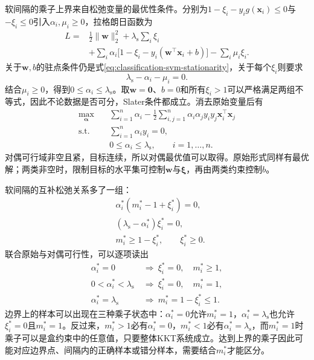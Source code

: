 软间隔的乘子上界来自松弛变量的最优性条件。分别为$1-\xi_i-y_i g(\bm{x}_i)\le0$与$-\xi_i\le0$引入$\alpha_i,\mu_i\ge0$，拉格朗日函数为
\[
  \begin{aligned}
    L={}&\frac12\lVert\bm{w}\rVert_2^2
       +\lambda_{\mathrm{s}}\sum_i\xi_i\\
      &+\sum_i\alpha_i
        \bigl[1-\xi_i-y_i(\bm{w}^{\top}\bm{x}_i+b)\bigr]
       -\sum_i\mu_i\xi_i.
  \end{aligned}
\]
关于$\bm{w},b$的驻点条件仍是式\eqref{eq:classification-svm-stationarity}，关于每个$\xi_i$则要求
\[
  \lambda_{\mathrm{s}}-\alpha_i-\mu_i=0.
\]
结合$\mu_i\ge0$，得到$0\le\alpha_i\le\lambda_{\mathrm{s}}$。取$\bm{w}=\bm{0}$、$b=0$和所有$\xi_i>1$可以严格满足两组不等式，因此不论数据是否可分，Slater条件都成立。消去原始变量后有
\begin{equation}
  \begin{aligned}
    \max_{\bm{\alpha}}\quad&
      \sum_{i=1}^n\alpha_i
       -\frac12\sum_{i,j=1}^n
         \alpha_i\alpha_j y_i y_j
         \bm{x}_i^{\top}\bm{x}_j\\
    \text{s.t.}\quad&
      \sum_{i=1}^n\alpha_i y_i=0,\\
    &0\le\alpha_i\le\lambda_{\mathrm{s}},
      \qquad i=1,\ldots,n.
  \end{aligned}
  \label{eq:classification-svm-soft-dual}
\end{equation}
对偶可行域非空且紧，目标连续，所以对偶最优值可以取得。原始形式同样有最优解；两类非空时，限制目标的水平集可控制$\bm{w}$与$\bm{\xi}$，再由两类约束控制$b$。

软间隔的互补松弛关系多了一组：
\begin{equation}
  \begin{aligned}
    &\alpha_i^{\ast}(m_i^{\ast}-1+\xi_i^{\ast})=0,\\
    &(\lambda_{\mathrm{s}}-\alpha_i^{\ast})\xi_i^{\ast}=0,\\
    &m_i^{\ast}\ge1-\xi_i^{\ast},\qquad \xi_i^{\ast}\ge0.
  \end{aligned}
  \label{eq:classification-svm-soft-kkt}
\end{equation}
联合原始与对偶可行性，可以逐项读出
\begin{equation}
  \begin{aligned}
    \alpha_i^{\ast}=0
      &\ \Longrightarrow\
        \xi_i^{\ast}=0,\quad m_i^{\ast}\ge1,\\
    0<\alpha_i^{\ast}<\lambda_{\mathrm{s}}
      &\ \Longrightarrow\
        \xi_i^{\ast}=0,\quad m_i^{\ast}=1,\\
    \alpha_i^{\ast}=\lambda_{\mathrm{s}}
      &\ \Longrightarrow\
        m_i^{\ast}=1-\xi_i^{\ast}\le1.
  \end{aligned}
  \label{eq:classification-svm-soft-cases}
\end{equation}
边界上的样本可以出现在三种乘子状态中：$\alpha_i^{\ast}=0$允许$m_i^{\ast}=1$，$\alpha_i^{\ast}=\lambda_{\mathrm{s}}$也允许$\xi_i^{\ast}=0$且$m_i^{\ast}=1$。反过来，$m_i^{\ast}>1$必有$\alpha_i^{\ast}=0$，$m_i^{\ast}<1$必有$\alpha_i^{\ast}=\lambda_{\mathrm{s}}$，而$m_i^{\ast}=1$时乘子可以是盒约束中的任意值，只要整体KKT系统成立。达到上界的乘子因此可能对应边界点、间隔内的正确样本或错分样本，需要结合$m_i^{\ast}$才能区分。

